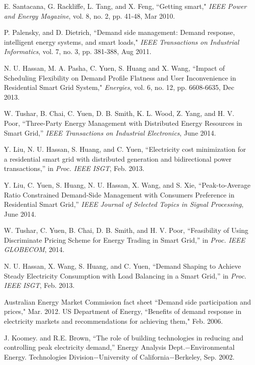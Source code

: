 \documentclass[10pt,twocolumn,twoside]{IEEEtran}
\begin{document}
\begin{thebibliography}{99}

 E. Santacana, G. Rackliffe, L. Tang, and X. Feng, ``Getting smart," \textit{IEEE Power and Energy Magazine}, vol. 8, no. 2, pp. 41-48, Mar 2010.

 P. Palensky, and D. Dietrich, ``Demand side management: Demand response, intelligent energy systems, and smart loads," \textit{IEEE Transactions on Industrial Informatics}, vol. 7, no. 3, pp. 381-388, Aug 2011.

 N. U. Hassan, M. A. Pasha, C. Yuen, S. Huang and X. Wang, ``Impact of Scheduling Flexibility on Demand Profile Flatness and User Inconvenience in Residential Smart Grid System," \textit{Energies}, vol. 6, no. 12, pp. 6608-6635, Dec 2013.

 W. Tushar, B. Chai, C. Yuen, D. B. Smith, K. L. Wood, Z. Yang, and H. V. Poor, ``Three-Party Energy Management with Distributed Energy Resources in Smart Grid,'' \textit{IEEE Transactions on Industrial Electronics}, June 2014.

 Y. Liu, N. U. Hassan, S. Huang, and C. Yuen, ``Electricity cost minimization for a residential smart grid with distributed generation and bidirectional power transactions,'' in \textit{Proc. IEEE ISGT}, Feb. 2013.

 Y. Liu, C. Yuen, S. Huang, N. U. Hassan, X. Wang, and S. Xie, ``Peak-to-Average Ratio Constrained Demand-Side Management with Consumers Preference in Residential Smart Grid,'' \textit{IEEE Journal of Selected Topics in Signal Processing}, June 2014.

 W. Tushar, C. Yuen, B. Chai, D. B. Smith, and H. V. Poor, ``Feasibility of Using Discriminate Pricing Scheme for Energy Trading in Smart Grid,'' in \textit{Proc. IEEE GLOBECOM}, 2014.


	N. U. Hassan, X. Wang, S. Huang, and C. Yuen, ``Demand Shaping to Achieve Steady Electricity Consumption with Load Balancing in a Smart Grid,'' in \textit{Proc. IEEE ISGT}, Feb. 2013.



 Australian Energy Market Commission fact sheet ``Demand side participation and prices," Mar. 2012.
 US Department of Energy, ``Benefits of demand response in electricity markets and recommendations for achieving them," Feb. 2006. 

 J. Koomey.  and  R.E. Brown, ``The role of building technologies in reducing and 
controlling peak electricity demand,''  Energy  Analysis  Dept.$-$Environmental Energy. 
Technologies  Division$-$University  of  California$-$Berkeley, Sep. 2002. 


\end{thebibliography}
\end{document}
